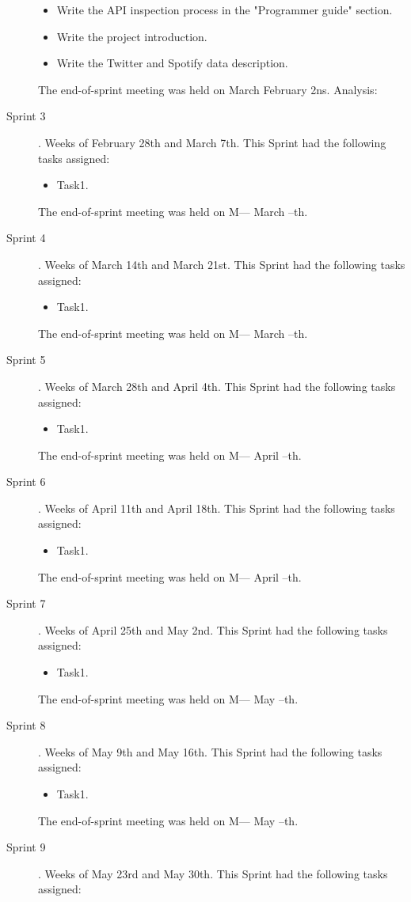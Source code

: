 \begin{description}
\begin{itemize}
		\item Write the API inspection process in the "Programmer guide" section.
		\item Write the project introduction.
		\item Write the Twitter and Spotify data description.
	\end{itemize}
	The end-of-sprint meeting was held on March February 2ns.
	Analysis: 
	\item[Sprint 3]. Weeks of February 28th and March 7th. This Sprint had the following tasks assigned:
	\begin{itemize}
		\item Task1.
	\end{itemize}
	The end-of-sprint meeting was held on M--- March --th.
	\item[Sprint 4]. Weeks of March 14th and March 21st. This Sprint had the following tasks assigned:
	\begin{itemize}
		\item Task1.
	\end{itemize}
	The end-of-sprint meeting was held on M--- March --th.
	\item[Sprint 5]. Weeks of March 28th and April 4th. This Sprint had the following tasks assigned:
	\begin{itemize}
		\item Task1.
	\end{itemize}
	The end-of-sprint meeting was held on M--- April --th.
	\item[Sprint 6]. Weeks of April 11th and April 18th. This Sprint had the following tasks assigned:
	\begin{itemize}
		\item Task1.
	\end{itemize}
	The end-of-sprint meeting was held on M--- April --th.
	\item[Sprint 7]. Weeks of April 25th and May 2nd. This Sprint had the following tasks assigned:
	\begin{itemize}
		\item Task1.
	\end{itemize}
	The end-of-sprint meeting was held on M--- May --th.
	\item[Sprint 8]. Weeks of May 9th and May 16th. This Sprint had the following tasks assigned:
	\begin{itemize}
		\item Task1.
	\end{itemize}
	The end-of-sprint meeting was held on M--- May --th.
	\item[Sprint 9]. Weeks of May 23rd and May 30th. This Sprint had the following tasks assigned:

\end{description}
